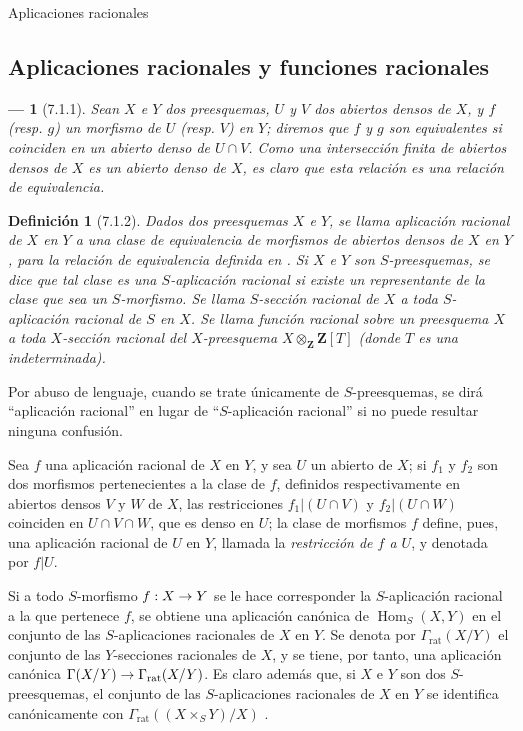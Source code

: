 \documentclass[oneside]{amsart}
\makeatletter
\theoremstyle{ega-env-style}
\newtheorem*{env}{---}
\theoremstyle{ega-thm-env-style}
\theoremstyle{ega-defn-env-style}
\newtheorem*{definition}{Definición}
\def\section{\@startsection{section}{1}%
  \z@{.7\linespacing\@plus\linespacing}{.5\linespacing}%
  {\normalfont\bfseries\Large\scshape\centering}}
\renewcommand{\to}{\mathchoice{\longrightarrow}{\rightarrow}{\rightarrow}{\rightarrow}}
\newcommand{\oldpage}[2][]{{\marginnote{\normalfont{\textbf{#1}~|~#2}}}\ignorespaces}
\let\EGAOriginalLabel\label
\renewcommand{\label}[1]{\phantomsection\EGAOriginalLabel{#1}}
\makeatother
\begin{document}
\section{Aplicaciones racionales}
\label{section:I.7}

\subsection{Aplicaciones racionales y funciones racionales}
\label{subsection:I.7.1}

\begin{env}[7.1.1]
\label{I.7.1.1}
Sean $X$ e $Y$ dos preesquemas, $U$ y $V$ dos abiertos densos de $X$, y $f$ (resp. $g$) un morfismo de $U$ (resp. $V$) en $Y$; diremos que $f$ y $g$ son \emph{equivalentes} si coinciden en un abierto denso de $U\cap V$.
Como una intersección finita de abiertos densos de $X$ es un abierto denso de $X$, es claro que esta relación es una \emph{relación de equivalencia}.
\end{env}

\begin{definition}[7.1.2]
\label{I.7.1.2}
{\itshape Dados dos preesquemas $X$ e $Y$, se llama aplicación racional de $X$ en $Y$ a una clase de equivalencia de morfismos de abiertos densos de $X$ en $Y$, para la relación de equivalencia definida en .
Si $X$ e $Y$ son $S$-preesquemas, se dice que tal clase es una $S$-aplicación racional si existe un representante de la clase que sea un $S$-morfismo.
Se llama $S$-sección racional de $X$ a toda $S$-aplicación racional de $S$ en $X$.
Se llama función racional sobre un preesquema $X$ a toda $X$-sección racional del $X$-preesquema $X\otimes_{\mathbf{Z}}\mathbf{Z}[T]$ (donde $T$ es una indeterminada).}
\end{definition}
Por abuso de lenguaje, cuando se trate únicamente de $S$-preesquemas, se dirá ``aplicación racional'' en lugar de ``$S$-aplicación racional'' si no puede resultar ninguna confusión.

Sea $f$ una aplicación racional de $X$ en $Y$, y sea $U$ un abierto de $X$; si $f_1$ y $f_2$ son dos morfismos pertenecientes a la clase de $f$, definidos respectivamente en abiertos densos $V$ y $W$ de $X$, las restricciones $f_1|(U\cap V)$ y $f_2|(U\cap W)$ coinciden en $U\cap V\cap W$, que es denso en $U$; la clase de morfismos $f$ define, pues, una aplicación racional de $U$ en $Y$, llamada la \emph{restricción de $f$ a $U$}, y denotada por $f|U$.

Si a todo $S$-morfismo $f:X\to Y$ se le hace corresponder la $S$-aplicación racional
\oldpage[I]{156}
a la que pertenece $f$, se obtiene una aplicación canónica de $\operatorname{Hom}_S(X,Y)$ en el conjunto de las $S$-aplicaciones racionales de $X$ en $Y$.
Se denota por $\Gamma_{\mathrm{rat}}(X/Y)$ el conjunto de las $Y$-secciones racionales de $X$, y se tiene, por tanto, una aplicación canónica $\Gamma(X/Y)\to\Gamma_{\mathrm{rat}}(X/Y)$.
Es claro además que, si $X$ e $Y$ son dos $S$-preesquemas, el conjunto de las $S$-aplicaciones racionales de $X$ en $Y$ se identifica canónicamente con $\Gamma_{\mathrm{rat}}((X\times_S Y)/X)$ .
\end{document}
